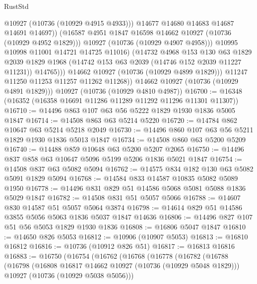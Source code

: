 \begin{lexlean}{RustStd}
\begin{coremodule}
                          @10927
                          (@10736 (@10929 @4915 @4933)))
                        @14677
                        @14680
                        @14683
                        @14687
                        @14691
                        @14697))
                    (@16587 @4951 @1847 @16598 @14662 @10927 (@10736 (@10929 @4952 @1829)))
                    @10927
                    (@10736 (@10929 @4907 @4958)))
                  @10995
                  @10998
                  @11001
                  @14721
                  @14725
                  @11016)
                (@14732
                  @4968
                  @153
                  @130
                  @63
                  @1829
                  @2039
                  @1829
                  @1968
                  (@14742 @153 @63 @2039 (@14746 @152 @2039 @11227 @11231))
                  @14765)))
            @14662
            @10927
            (@10736 (@10929 @4899 @1829)))
          @11247
          @11250
          @11253
          @11257
          @11262
          @11268))
      @14662
      @10927
      (@10736 (@10929 @4891 @1829)))
    @10927
    (@10736 (@10929 @4810 @4987))
@16700 := @16348 (@16352 (@16358 @16691 @11286 @11289 @11292 @11296 @11301 @11307))
@16710 := @14496 @863 @107 @63 @56 @5222 @1829 @1930 @1836 @5005 @1847
@16714 := @14508 @863 @63 @5214 @5220
@16720 := @14784 @862 @10647 @63 @5214 @5218 @2049
@16730 := @14496 @860 @107 @63 @56 @5211 @1829 @1930 @1836 @5013 @1847
@16734 := @14508 @860 @63 @5200 @5209
@16740 := @14488 @859 @10648 @63 @5200 @5207 @2065
@16750 := @14496 @837 @858 @63 @10647 @5096 @5199 @5206 @1836 @5021 @1847
@16754 := @14508 @837 @63 @5082 @5094
@16762 := @14575 @834 @182 @130 @63 @5082 @5091 @1829 @5094
@16768 := @14584 @833 @14587 @10835 @5082 @5089 @1950
@16778 := @14496 @831 @829 @51 @14586 @5068 @5081 @5088 @1836 @5029 @1847
@16782 := @14508 @831 @51 @5057 @5066
@16788 := @14607 @830 @14587 @51 @5057 @5064 @3874
@16798 := @14614 @829 @51 @14586 @3855 @5056 @5063 @1836 @5037 @1847 @14636
@16806 := @14496 @827 @107 @51 @56 @5053 @1829 @1930 @1836
@16808 := @16806 @5047 @1847
@16810 := @14650 @826 @5053
@16812 := @10906 (@10907 @5053)
@16813 := @16810 @16812
@16816 := @10736 (@10912 @826 @51)
@16817 := @16813 @16816
@16883 := @16750
    (@16754
      (@16762
        (@16768
          (@16778
            (@16782
              (@16788
                (@16798
                  (@16808 @16817 @14662 @10927 (@10736 (@10929 @5048 @1829)))
                  @10927
                  (@10736 (@10929 @5038 @5056)))

\end{coremodule}
\end{lexlean}
